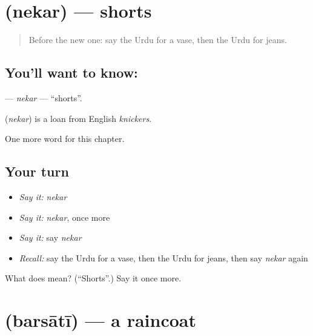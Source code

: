 \section[\texorpdfstring{\ur{نیکر} (nekar)}{نیکر (nekar)}]{ (nekar) — shorts}

\label{lesson:UR-C251-nekar}



\begin{quote}
Before the new one: say the Urdu for a vase, then the Urdu for jeans.
\end{quote}

\subsection*{You'll want to know: }
\textbf{} — \emph{nekar} — \textquotedblleft{}shorts\textquotedblright{}.

\begin{cousinweb}
\textbf{} (\emph{nekar}) is a loan from English \emph{knickers}.
\end{cousinweb}

\begin{grammarlens}[title={What you've built}]
One more word for this chapter.
\end{grammarlens}

\subsection*{Your turn}
\begin{itemize}
\raggedright
  \item \emph{Say it:} \emph{nekar}
  \item \emph{Say it:} \emph{nekar}, once more
  \item \emph{Say it:} say \emph{nekar}
  \item \emph{Recall:} say the Urdu for a vase, then the Urdu for jeans, then say \emph{nekar} again
\end{itemize}

\begin{tcolorbox}[breakable,colback=teal!4,colframe=teal!35!black,title={Before you move on}]
What does  mean? (\textquotedblleft{}Shorts\textquotedblright{}.) Say it once more.
\end{tcolorbox}
\section[\texorpdfstring{\ur{برساتی} (barsātī)}{برساتی (barsātī)}]{ (barsātī) — a raincoat}

